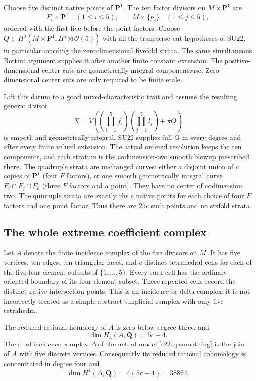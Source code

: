 Choose five distinct native points of $\mathbf P^1$.
The ten factor divisors on $M\times\mathbf P^1$ are
\[
 F_i\times\mathbf P^1\quad(1\le i\le5),\qquad
 M\times\{p_j\}\quad(1\le j\le5),
 \tag{SQ22.3}\label{r22sq:factors}
\]
ordered with the first five before the point factors.  Choose
$Q\in H^0(M\times\mathbf P^1,H^5\boxtimes\mathcal O(5))$
with all the transverse-cut hypotheses of SU22, in particular
avoiding the zero-dimensional fivefold strata.  The same
simultaneous Bertini argument supplies it after another finite
constant extension.  The positive-dimensional center cuts are
geometrically integral componentwise.  Zero-dimensional center
cuts are only required to be finite etale.

Lift this datum to a good mixed-characteristic trait and
assume the resulting generic divisor
\[
          X=V\left((\prod_{i=1}^5 f_i)(\prod_{j=1}^5 l_j)
                                      +\pi Q\right)
 \tag{SQ22.4}\label{r22sq:smoothing}
\]
is smooth and geometrically integral.  SU22 supplies full G
in every degree and after every finite valued extension.
The actual ordered resolution keeps the ten components,
and each stratum is the codimension-two smooth blowup
prescribed there.  The quadruple strata are unchanged curves:
either a disjoint union of $c$ copies of $\mathbf P^1$
(four $F$ factors), or one smooth geometrically integral
curve $F_i\cap F_j\cap F_k$ (three $F$ factors and a point).
They have no center of codimension two.  The quintuple
strata are exactly the $c$ native points for each choice
of four $F$ factors and one point factor.  Thus there are
$25c$ such points and no sixfold strata.

\subsection{The whole extreme coefficient complex}

Let $A$ denote the finite incidence complex of the five
divisors on $M$.  It has five vertices, ten edges, ten
triangular faces, and $c$ distinct tetrahedral cells for
each of the five four-element subsets of $\{1,\ldots,5\}$.
Every such cell has the ordinary oriented boundary of its
four-element subset.  These repeated cells record the
distinct native intersection points.  This is an incidence
or delta-complex; it is not incorrectly treated as a simple
abstract simplicial complex with only five tetrahedra.

\begin{lemma}
\label{r22sq:incidence}
The reduced rational homology of $A$ is zero below degree
three, and
\[
                         \dim H_3(A,\mathbf Q)=5c-4.
 \tag{SQ22.5}\label{r22sq:H3}
\]
The dual incidence complex $\Delta$ of the actual model
\eqref{r22sq:smoothing} is the join of $A$ with five discrete
vertices.  Consequently its reduced rational cohomology is
concentrated in degree four and
\[
                     \dim H^4(\Delta,\mathbf Q)=4(5c-4)=38864.
 \tag{SQ22.6}\label{r22sq:H4}
\]
\end{lemma}

